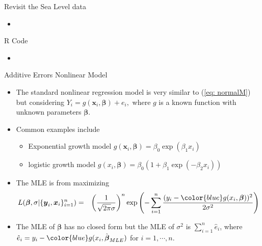 \documentclass{beamer}
\begin{document}
        \begin{frame}{Revisit the Sea Level data}
        \begin{itemize}
          \item
        \end{itemize}
    \end{frame}
    
    
            \begin{frame}{R Code}
        \begin{itemize}
           \item
        \end{itemize}
    \end{frame}
    



    \begin{frame}{Additive Errors Nonlinear Model}
        \begin{itemize}
            \item The standard nonlinear regression model is very similar to (\ref{eq: normalM}) but considering $Y_{i} = g(\boldsymbol{x}_{i}, \boldsymbol{\beta}) + e_{i},$
            where $g$ is a known function with unknown parameters $\boldsymbol{\beta}$.
            \item Common examples include 
            \begin{itemize}
                \item Exponential growth model $g(\boldsymbol{x}_{i}, \boldsymbol{\beta}) = \beta_{0}\exp(\beta_{1}x_{i})$
                \item logistic growth model $g(x_{i}, \boldsymbol{\beta}) = \beta_{0}(1+\beta_{1}\exp(-\beta_{2}x_{i}))$
            \end{itemize}
            \item The MLE is from maximizing
             \begin{eqnarray}
                L(\boldsymbol{\beta}, \sigma |\{\boldsymbol{y}_{i}, \boldsymbol{x}_{i}\}^{n}_{i=1}) 
                & = & \left(\frac{1}{\sqrt{2\pi}\sigma}\right)^{n}\exp\left(-\sum^{n}_{i=1}\frac{(y_{i}-{{\color{blue} g(x_{i}, \boldsymbol{\beta}})})^2}{2\sigma^2}\right) \nonumber
            \end{eqnarray}
            \item The MLE of $\boldsymbol{\beta}$ has no closed form but the MLE of $\sigma^2$ is  
            $\sum^{n}_{i=1} \hat{e}_{i}$,
            where $\hat{e}_{i} = y_{i} - \color{blue} g(x_{i}, \hat{\boldsymbol{\beta}}_{MLE})$ for $i = 1, \cdots, n.$
        \end{itemize}
    \end{frame}
    
\end{document}
